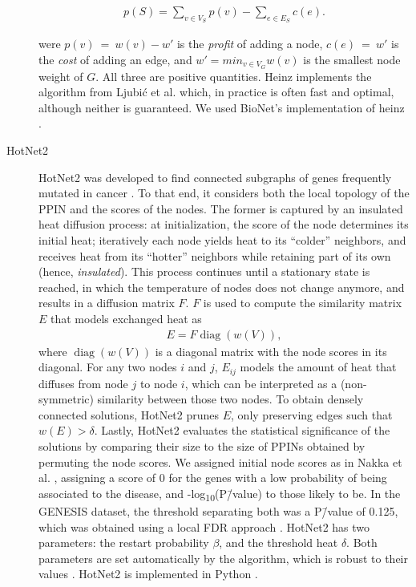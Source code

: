 \documentclass[10pt,letterpaper]{article}
\begin{document}
\begin{description}
\begin{eqnarray}
p(S) = \sum_{v \in V_S} p(v) - \sum_{e \in E_S} c(e). 
\end{eqnarray}

were $p(v)~=~w(v) - w'$ is the \emph{profit} of adding a node, $c(e)~=~w'$ is the \emph{cost} of adding an edge, and $w' = min_{v \in V_{G}} w(v)$ is the smallest node weight of $G$. All three are positive quantities. Heinz implements the algorithm from Ljubić et al. \cite{ljubic_algorithmic_2006} which, in practice is often fast and optimal, although neither is guaranteed. We used BioNet's implementation of heinz \cite{beisser_bionet:_2010,heinz}.

\item[{HotNet2}] HotNet2 was developed to find connected subgraphs of genes frequently mutated in cancer \cite{leiserson_pan-cancer_2015}. To that end, it considers both the local topology of the PPIN and the scores of the nodes. The former is captured by an insulated heat diffusion process: at initialization, the score of the node determines its initial heat; iteratively each node yields heat to its ``colder'' neighbors, and receives heat from its ``hotter'' neighbors while retaining part of its own (hence, \emph{insulated}). This process continues until a stationary state is reached, in which the temperature of nodes does not change anymore, and results in a diffusion matrix $F$. $F$ is used to compute the similarity matrix $E$ that models exchanged heat as
\begin{eqnarray} 
E = F \operatorname{diag}(w(V)), 
\end{eqnarray}
where $\operatorname{diag}(w(V))$ is a diagonal matrix with the node scores in its diagonal. For any two nodes $i$ and $j$, $E_{ij}$ models the amount of heat that diffuses from node $j$ to node $i$, which can be interpreted as a (non-symmetric) similarity between those two nodes. To obtain densely connected solutions, HotNet2 prunes $E$, only preserving edges such that $w(E) > \delta$. Lastly, HotNet2 evaluates the statistical significance of the solutions by comparing their size to the size of PPINs obtained by permuting the node scores. We assigned initial node scores as in Nakka et al. \cite{nakka_gene_2016}, assigning a score of 0 for the genes with a low probability of being associated to the disease, and -log\textsubscript{10}(P\=/value) to those likely to be. In the GENESIS dataset, the threshold separating both was a P\=/value of 0.125, which was obtained using a local FDR approach \cite{scheid_twilight;_2005}. HotNet2 has two parameters: the restart probability \(\beta\), and the threshold heat \(\delta\). Both parameters are set automatically by the algorithm, which is robust to their values \cite{leiserson_pan-cancer_2015}. HotNet2 is implemented in Python \cite{hotnet2}.


\end{description}
\end{document}
